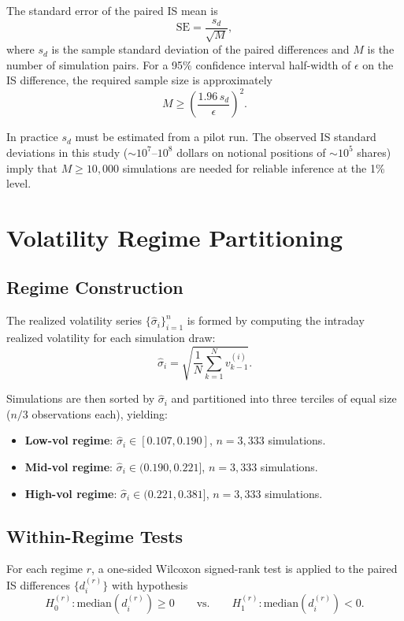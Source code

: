 \documentclass[11pt]{article}
\begin{document}
The standard error of the paired IS mean is
\[
\mathrm{SE} = \frac{s_d}{\sqrt{M}},
\]
where $s_d$ is the sample standard deviation of the paired differences and $M$ is the number of simulation pairs. For a 95\% confidence interval half-width of $\epsilon$ on the IS difference, the required sample size is approximately
\[
M \geq \left(\frac{1.96\,s_d}{\epsilon}\right)^2.
\]

In practice $s_d$ must be estimated from a pilot run. The observed IS standard deviations in this study ($\sim 10^7$--$10^8$ dollars on notional positions of $\sim 10^5$ shares) imply that $M \geq 10{,}000$ simulations are needed for reliable inference at the 1\% level.

\section{Volatility Regime Partitioning}
\label{app:regimes}

\subsection{Regime Construction}

The realized volatility series $\{\hat\sigma_i\}_{i=1}^n$ is formed by computing the intraday realized volatility for each simulation draw:
\[
\hat\sigma_i = \sqrt{\frac{1}{N}\sum_{k=1}^N v_{k-1}^{(i)}}.
\]

Simulations are then sorted by $\hat\sigma_i$ and partitioned into three terciles of equal size ($n/3$ observations each), yielding:
\begin{itemize}
\item \textbf{Low-vol regime}: $\hat\sigma_i \in [0.107, 0.190]$, $n = 3{,}333$ simulations.
\item \textbf{Mid-vol regime}: $\hat\sigma_i \in (0.190, 0.221]$, $n = 3{,}333$ simulations.
\item \textbf{High-vol regime}: $\hat\sigma_i \in (0.221, 0.381]$, $n = 3{,}333$ simulations.
\end{itemize}

\subsection{Within-Regime Tests}

For each regime $r$, a one-sided Wilcoxon signed-rank test is applied to the paired IS differences $\{d_i^{(r)}\}$ with hypothesis
\[
H_0^{(r)}: \mathrm{median}(d_i^{(r)}) \geq 0
\qquad\text{vs.}\qquad
H_1^{(r)}: \mathrm{median}(d_i^{(r)}) < 0.
\]
\end{document}
